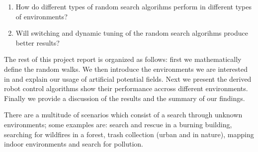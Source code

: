 \begin{enumerate}
\item How do different types of random search algorihms perform in different types of environments?
\item Will switching and dynamic tuning of the random search algorihms produce better results?
\end{enumerate}

The rest of this project report is organized as follows: first we mathematically define 
the random walks. We then introduce the environments we are interested in and 
explain our usage of artificial potential fields.
Next we present the derived robot control algorithms show their performance accross different 
environments. Finally we provide a discussion of the results and the summary of our findings.



There are a multitude of scenarios which consist of a search through unknown environments; some examples are: search and rescue in a burning building, searching for wildfires in a forest, trash collection (urban and in nature), mapping indoor environments and search for pollution. 




